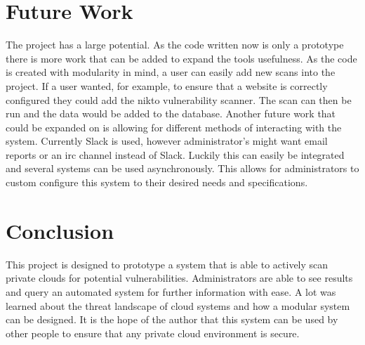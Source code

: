 \documentclass[12pt]{article}
\begin{document}
\section{Future Work}
The project has a large potential. As the code written now is only a prototype there is more work that can be added to expand the tools usefulness. As the code is created with modularity in mind, a user can easily add new scans into the project. If a user wanted, for example, to ensure that a website is correctly configured they could add the nikto \cite{NiktoScan} vulnerability scanner. The scan can then be run and the data would be added to the database. Another future work that could be expanded on is allowing for different methods of interacting with the system. Currently Slack is used, however administrator's might want email reports or an irc channel instead of Slack. Luckily this can easily be integrated and several systems can be used asynchronously. This allows for administrators to custom configure this system to their desired needs and specifications.

\section{Conclusion}
This project is designed to prototype a system that is able to actively scan private clouds for potential vulnerabilities. Administrators are able to see results and query an automated system for further information with ease. A lot was learned about the threat landscape of cloud systems and how a modular system can be designed. It is the hope of the author that this system can be used by other people to ensure that any private cloud environment is secure.  



\newpage


\newpage
\appendix
\section{}

\end{document}
